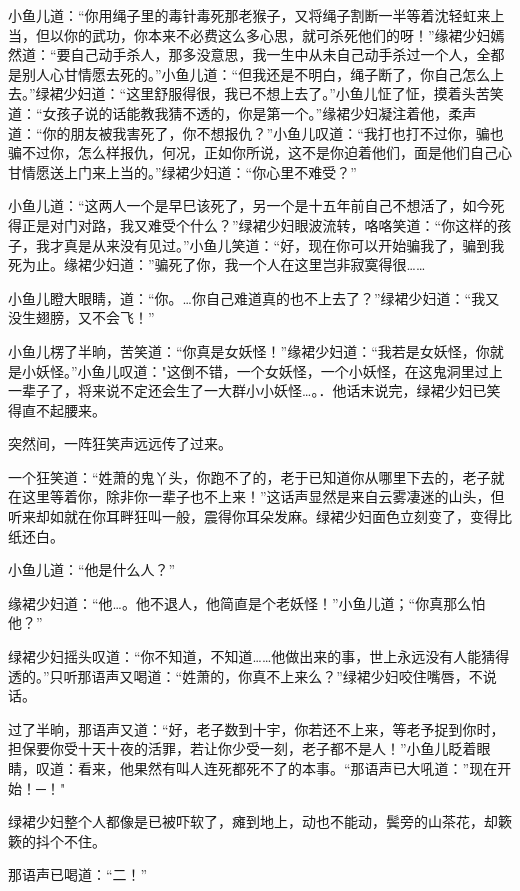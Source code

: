 \documentclass[12pt,oneside]{book}
\begin{document}
小鱼儿道：``你用绳子里的毒针毒死那老猴子，又将绳子割断一半等着沈轻虹来上当，但以你的武功，你本来不必费这么多心思，就可杀死他们的呀！''缘裙少妇嫣然道：``要自己动手杀人，那多没意思，我一生中从未自己动手杀过一个人，全都是别人心甘情愿去死的。''小鱼儿道：``但我还是不明白，绳子断了，你自己怎么上去。''绿裙少妇道：``这里舒服得很，我已不想上去了。''小鱼儿怔了怔，摸着头苦笑道：``女孩子说的话能教我猜不透的，你是第一个。''缘裙少妇凝注着他，柔声道：``你的朋友被我害死了，你不想报仇？''小鱼儿叹道：``我打也打不过你，骗也骗不过你，怎么样报仇，何况，正如你所说，这不是你迫着他们，面是他们自己心甘情愿送上门来上当的。''绿裙少妇道：``你心里不难受？''

小鱼儿道：``这两人一个是早巳该死了，另一个是十五年前自己不想活了，如今死得正是对门对路，我又难受个什么？''绿裙少妇眼波流转，咯咯笑道：``你这样的孩子，我才真是从来没有见过。''小鱼儿笑道：``好，现在你可以开始骗我了，骗到我死为止。缘裙少妇道：''骗死了你，我一个人在这里岂非寂寞得很\ldots\ldots{}

小鱼儿瞪大眼睛，道：``你。\ldots 你自己难道真的也不上去了？''绿裙少妇道：``我又没生翅膀，又不会飞！''

小鱼儿楞了半晌，苦笑道：``你真是女妖怪！''缘裙少妇道：``我若是女妖怪，你就是小妖怪。''小鱼儿叹道："这倒不错，一个女妖怪，一个小妖怪，在这鬼洞里过上一辈子了，将来说不定还会生了一大群小小妖怪\ldots。．他话末说完，绿裙少妇已笑得直不起腰来。

突然间，一阵狂笑声远远传了过来。

一个狂笑道：``姓萧的鬼丫头，你跑不了的，老于已知道你从哪里下去的，老子就在这里等着你，除非你一辈子也不上来！''这话声显然是来自云雾凄迷的山头，但听来却如就在你耳畔狂叫一般，震得你耳朵发麻。绿裙少妇面色立刻变了，变得比纸还白。

小鱼儿道：``他是什么人？''

缘裙少妇道：``他\ldots。他不退人，他简直是个老妖怪！''小鱼儿道；``你真那么怕他？''

绿裙少妇摇头叹道：``你不知道，不知道\ldots\ldots 他做出来的事，世上永远没有人能猜得透的。''只听那语声又喝道：``姓萧的，你真不上来么？''绿裙少妇咬住嘴唇，不说话。

过了半晌，那语声又道：``好，老子数到十宇，你若还不上来，等老予捉到你时，担保要你受十天十夜的活罪，若让你少受一刻，老子都不是人！''小鱼儿眨着眼睛，叹道：看来，他果然有叫人连死都死不了的本事。``那语声已大吼道：''现在开始！─！"

绿裙少妇整个人都像是已被吓软了，瘫到地上，动也不能动，鬓旁的山茶花，却簌簌的抖个不住。

那语声已喝道：``二！''
\end{document}
